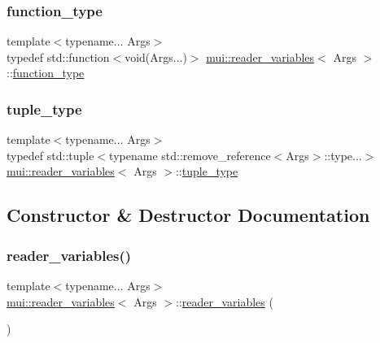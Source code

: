 \subsubsection{\texorpdfstring{function\+\_\+type}{function\_type}}
{\footnotesize\ttfamily template$<$typename... Args$>$ \\
typedef std\+::function$<$void(Args...)$>$ \hyperlink{structmui_1_1reader__variables}{mui\+::reader\+\_\+variables}$<$ Args $>$\+::\hyperlink{structmui_1_1reader__variables_a55fa3e6c55f9ce1a4f4031de4c9843e4}{function\+\_\+type}}

\mbox{\label{structmui_1_1reader__variables_a84bdea853e82725af84c870382869ee1}} 
\subsubsection{\texorpdfstring{tuple\+\_\+type}{tuple\_type}}
{\footnotesize\ttfamily template$<$typename... Args$>$ \\
typedef std\+::tuple$<$typename std\+::remove\+\_\+reference$<$Args$>$\+::type...$>$ \hyperlink{structmui_1_1reader__variables}{mui\+::reader\+\_\+variables}$<$ Args $>$\+::\hyperlink{structmui_1_1reader__variables_a84bdea853e82725af84c870382869ee1}{tuple\+\_\+type}}



\subsection{Constructor \& Destructor Documentation}
\mbox{\label{structmui_1_1reader__variables_ac91f32d1e2e6171eff8285c37082dbbd}} 
\subsubsection{\texorpdfstring{reader\+\_\+variables()}{reader\_variables()}\hspace{0.1cm}{\footnotesize\ttfamily [1/2]}}
{\footnotesize\ttfamily template$<$typename... Args$>$ \\
\hyperlink{structmui_1_1reader__variables}{mui\+::reader\+\_\+variables}$<$ Args $>$\+::\hyperlink{structmui_1_1reader__variables}{reader\+\_\+variables} (\begin{DoxyParamCaption}{ }\end{DoxyParamCaption})\hspace{0.3cm}{\ttfamily [default]}}

